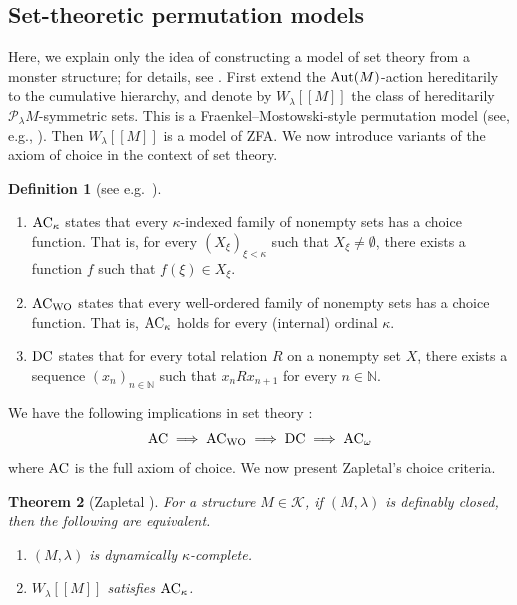 \documentclass[10pt]{amsart}
\numberwithin{equation}{section}
\theoremstyle{plain}
\newtheorem{theorem}{Theorem}[section]
\theoremstyle{definition}
\newtheorem{definition}[theorem]{Definition}
\newcommand{\N}{\mathbb{N}}
\newcommand{\om}{\omega}
\newcommand{\K}{\mathcal{K}}
\begin{document}
\subsection{Set-theoretic permutation models}
Here, we explain only the idea of constructing a model of set theory from a monster structure; for details, see \cite{Zap26}.
First extend the ${\rm Aut}(M)$-action hereditarily to the cumulative hierarchy, and denote by $W_\lambda[[M]]$ the class of hereditarily $\mathcal{P}_\lambda M$-symmetric sets.
This is a Fraenkel--Mostowski-style permutation model (see, e.g., \cite{JechAC,Zap26}).
Then $W_\lambda[[M]]$ is a model of ZFA.
We now introduce variants of the axiom of choice in the context of set theory.


\begin{definition}[see e.g.~\cite{JechAC,HoRu98}]~
\begin{enumerate}
\item ${\rm AC}_\kappa$ states that every $\kappa$-indexed family of nonempty sets has a choice function.
That is, for every $(X_\xi)_{\xi<\kappa}$ such that $X_\xi\not=\emptyset$, there exists a function $f$ such that $f(\xi)\in X_\xi$.
\item ${\rm AC}_{\rm WO}$ states that every well-ordered family of nonempty sets has a choice function.
That is, ${\rm AC}_\kappa$ holds for every (internal) ordinal $\kappa$.
\item ${\rm DC}$ states that for every total relation $R$ on a nonempty set $X$, there exists a sequence $(x_n)_{n\in\N}$ such that $x_nRx_{n+1}$ for every $n\in\N$.
\end{enumerate}
\end{definition}

We have the following implications in set theory \cite[Section 8.1]{JechAC}:
\[{\rm AC}\implies{\rm AC}_{\rm WO}\implies{\rm DC}\implies{\rm AC}_\om\]
where ${\rm AC}$ is the full axiom of choice.
We now present Zapletal's choice criteria.

\begin{theorem}[Zapletal {\cite[Theorem 5.3]{Zap26}}]\label{thm:Zapletal1}
For a structure $M\in\K$, if $(M,\lambda)$ is definably closed, then the following are equivalent.
\begin{enumerate}
\item $(M,\lambda)$ is dynamically $\kappa$-complete.
\item $W_\lambda[[M]]$ satisfies ${\rm AC}_\kappa$.
\end{enumerate}
\end{theorem}
\end{document}
